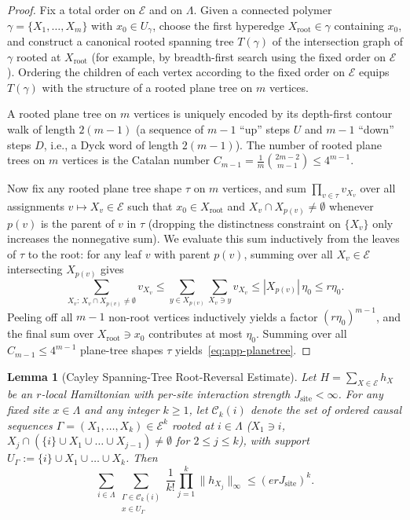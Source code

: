 \documentclass[11pt,a4paper]{article}
\numberwithin{equation}{section}
\theoremstyle{plain}
\newtheorem{lemma}[theorem]{Lemma}
\theoremstyle{definition}
\begin{document}
\begin{proof}
Fix a total order on $\mathcal{E}$ and on $\Lambda$. Given a connected polymer $\gamma = \{X_1,\dots,X_m\}$ with $x_0\in U_\gamma$, choose the first hyperedge $X_{\mathrm{root}}\in\gamma$ containing $x_0$, and construct a canonical rooted spanning tree $T(\gamma)$ of the intersection graph of $\gamma$ rooted at $X_{\mathrm{root}}$ (for example, by breadth-first search using the fixed order on $\mathcal{E}$). Ordering the children of each vertex according to the fixed order on $\mathcal{E}$ equips $T(\gamma)$ with the structure of a rooted plane tree on $m$ vertices.

A rooted plane tree on $m$ vertices is uniquely encoded by its depth-first contour walk of length $2(m-1)$ (a sequence of $m-1$ ``up'' steps $U$ and $m-1$ ``down'' steps $D$, i.e., a Dyck word of length $2(m-1)$). The number of rooted plane trees on $m$ vertices is the Catalan number $C_{m-1} = \frac{1}{m}\binom{2m-2}{m-1} \le 4^{m-1}$.

Now fix any rooted plane tree shape $\tau$ on $m$ vertices, and sum $\prod_{v\in\tau} v_{X_v}$ over all assignments $v\mapsto X_v\in\mathcal{E}$ such that $x_0\in X_{\mathrm{root}}$ and $X_v\cap X_{p(v)}\ne\emptyset$ whenever $p(v)$ is the parent of $v$ in $\tau$ (dropping the distinctness constraint on $\{X_v\}$ only increases the nonnegative sum). We evaluate this sum inductively from the leaves of $\tau$ to the root: for any leaf $v$ with parent $p(v)$, summing over all $X_v\in\mathcal{E}$ intersecting $X_{p(v)}$ gives
\[
  \sum_{X_v:\, X_v\cap X_{p(v)}\ne\emptyset} v_{X_v}
  \le \sum_{y\in X_{p(v)}}\sum_{X_v\ni y} v_{X_v}
  \le |X_{p(v)}|\,\eta_0 \le r\eta_0.
\]
Peeling off all $m-1$ non-root vertices inductively yields a factor $(r\eta_0)^{m-1}$, and the final sum over $X_{\mathrm{root}}\ni x_0$ contributes at most $\eta_0$. Summing over all $C_{m-1} \le 4^{m-1}$ plane-tree shapes $\tau$ yields~\eqref{eq:app-planetree}.
\end{proof}

\begin{lemma}[Cayley Spanning-Tree Root-Reversal Estimate]\label{lem:app-cayley}
Let $H = \sum_{X\in\mathcal{E}} h_X$ be an $r$-local Hamiltonian with per-site interaction strength $J_{\mathrm{site}} < \infty$. For any fixed site $x\in\Lambda$ and any integer $k\ge 1$, let $\mathcal{C}_k(i)$ denote the set of ordered causal sequences $\Gamma = (X_1,\dots,X_k)\in\mathcal{E}^k$ rooted at $i\in\Lambda$ ($X_1\ni i$, $X_j\cap(\{i\}\cup X_1\cup\dots\cup X_{j-1})\ne\emptyset$ for $2\le j\le k$), with support $U_\Gamma := \{i\}\cup X_1\cup\dots\cup X_k$. Then
\begin{equation}\label{eq:app-cayley}
  \sum_{i\in\Lambda}\sum_{\substack{\Gamma\in\mathcal{C}_k(i) \\ x\in U_\Gamma}} \frac{1}{k!}\prod_{j=1}^k \|h_{X_j}\|_\infty
  \le (er J_{\mathrm{site}})^k.
\end{equation}
\end{lemma}
\end{document}

